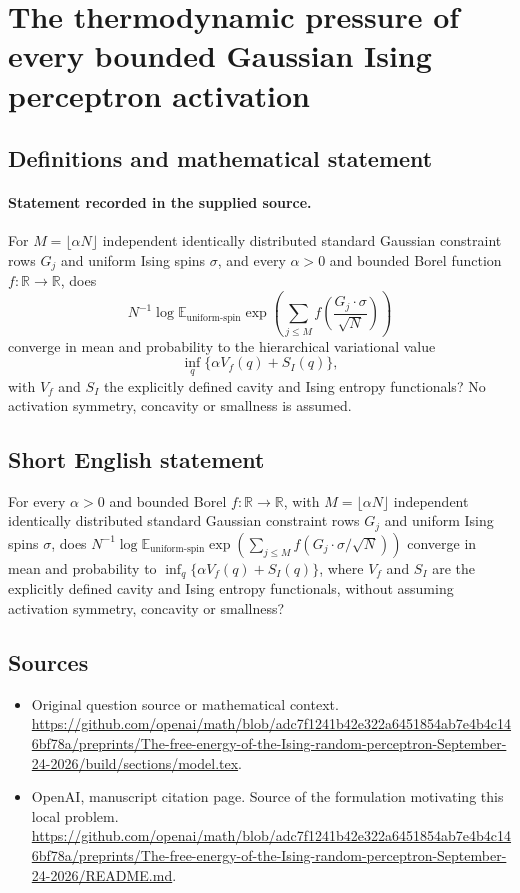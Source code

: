 \documentclass[11pt]{article}
\begin{document}
\section*{The thermodynamic pressure of every bounded Gaussian Ising perceptron activation}\label{30007374}
\subsection{Definitions and mathematical statement}
\paragraph{Statement recorded in the supplied source.}
For $M=\lfloor\alpha N\rfloor$ independent identically distributed standard Gaussian constraint rows $G_j$ and uniform Ising spins $\sigma$, and every $\alpha>0$ and bounded Borel function $f:\mathbb{R}\to\mathbb{R}$, does
\[
N^{-1}\log\mathbb{E}_{\mathrm{uniform\text{-}spin}}
\exp\left(\sum_{j\leq M}f\left(\frac{G_j\cdot\sigma}{\sqrt N}\right)\right)
\]
converge in mean and probability to the hierarchical variational value
\[
\inf_q\{\alpha V_f(q)+S_I(q)\},
\]
with $V_f$ and $S_I$ the explicitly defined cavity and Ising entropy functionals? No activation symmetry, concavity or smallness is assumed.
\subsection{Short English statement}
For every $\alpha>0$ and bounded Borel $f:\mathbb{R}\to\mathbb{R}$, with $M=\lfloor\alpha N\rfloor$ independent identically distributed standard Gaussian constraint rows $G_j$ and uniform Ising spins $\sigma$, does $N^{-1}\log\mathbb{E}_{\mathrm{uniform\text{-}spin}}\exp(\sum_{j\leq M}f(G_j\cdot\sigma/\sqrt N))$ converge in mean and probability to $\inf_q\{\alpha V_f(q)+S_I(q)\}$, where $V_f$ and $S_I$ are the explicitly defined cavity and Ising entropy functionals, without assuming activation symmetry, concavity or smallness?
\subsection{Sources}
\begin{itemize}
\item[S1] Original question source or mathematical context.
\url{https://github.com/openai/math/blob/adc7f1241b42e322a6451854ab7e4b4c146bf78a/preprints/The-free-energy-of-the-Ising-random-perceptron-September-24-2026/build/sections/model.tex}.
\item[S2] OpenAI, manuscript citation page. Source of the formulation motivating this local problem.
\url{https://github.com/openai/math/blob/adc7f1241b42e322a6451854ab7e4b4c146bf78a/preprints/The-free-energy-of-the-Ising-random-perceptron-September-24-2026/README.md}.
\end{itemize}
\end{document}
